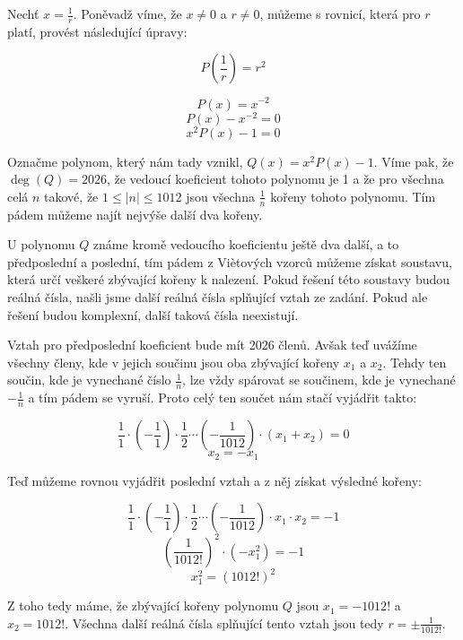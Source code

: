 \documentclass{fkssolpub}
\author{Ondřej Sedláček}
\begin{document}
Nechť $x = \frac{1}{r}$. Poněvadž víme, že $x \neq 0$ a $r \neq 0$, můžeme s rovnicí, která pro $r$ platí, provést následující úpravy:

\[
	P\left(\frac{1}{r}\right) = r^2
\]

\[
	P\left(x\right) = x^{-2}
\]
\[
	P\left(x\right) - x^{-2} = 0
\]
\[
	x^2 P(x) - 1 = 0
\]

Označme polynom, který nám tady vznikl, $Q(x) = x^2 P(x) - 1$. Víme pak, že $\deg(Q) = 2026$, že vedoucí koeficient tohoto polynomu je 1 a že pro všechna celá $n$ takové, že $1 \leq |n| \leq 1012$ jsou všechna $\frac{1}{n}$ kořeny tohoto polynomu. Tím pádem můžeme najít nejvýše další dva kořeny.

U polynomu $Q$ známe kromě vedoucího koeficientu ještě dva další, a to předposlední a poslední, tím pádem z Vi\` etových vzorců můžeme získat soustavu, která určí veškeré zbývající kořeny k nalezení. Pokud řešení této soustavy budou reálná čísla, našli jsme další reálná čísla splňující vztah ze zadání. Pokud ale řešení budou komplexní, další taková čísla neexistují.

Vztah pro předposlední koeficient bude mít 2026 členů. Avšak teď uvážíme všechny členy, kde v jejich součinu jsou oba zbývající kořeny $x_1$ a $x_2$. Tehdy ten součin, kde je vynechané číslo $\frac{1}{n}$, lze vždy spárovat se součinem, kde je vynechané $ - \frac{1}{n}$ a tím pádem se vyruší. Proto celý ten součet nám stačí vyjádřit takto:

\[
	\frac{1}{1} \cdot \left(- \frac{1}{1}\right) \cdot \frac{1}{2} \cdots \left(- \frac{1}{1012}\right) \cdot \left(x_1 + x_2\right) = 0
\]
\[
	x_2 = - x_1
\]

Teď můžeme rovnou vyjádřit poslední vztah a z něj získat výsledné kořeny:

\[
	\frac{1}{1} \cdot \left(- \frac{1}{1}\right) \cdot \frac{1}{2} \cdots \left(- \frac{1}{1012}\right) \cdot x_1 \cdot x_2 = -1
\]
\[
	\left(\frac{1}{1012!}\right)^2 \cdot (- x_1^2) = -1
\]
\[
	x_1^2 = (1012!)^2
\]

Z toho tedy máme, že zbývající kořeny polynomu $Q$ jsou $x_1 = - 1012!$ a $x_2 = 1012!$. Všechna další reálná čísla splňující tento vztah jsou tedy $r = \pm \frac{1}{1012!}$.
\end{document}
